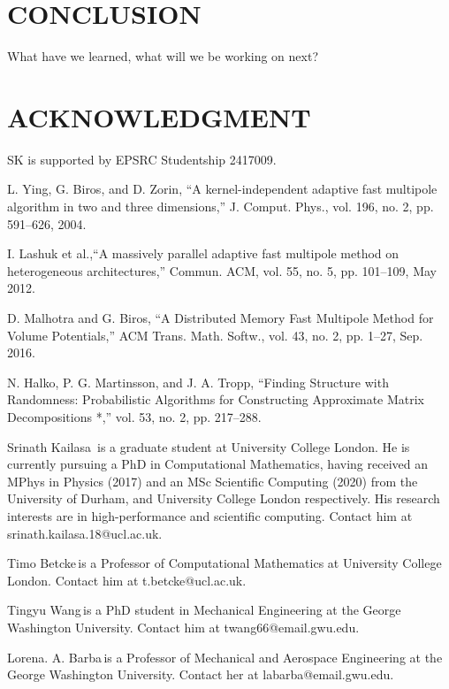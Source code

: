 \documentclass{IEEEcsmag}
\begin{document}
\section{CONCLUSION}

What have we learned, what will we be working on next?

\section{ACKNOWLEDGMENT}

SK is supported by EPSRC Studentship 2417009.

\begin{thebibliography}{1}

L. Ying, G. Biros, and D. Zorin, “A kernel-independent adaptive fast multipole algorithm in two and three dimensions,” J. Comput. Phys., vol. 196, no. 2, pp. 591–626, 2004.

I. Lashuk et al.,``A massively parallel adaptive fast multipole method on heterogeneous architectures,'' Commun. ACM, vol. 55, no. 5, pp. 101–109, May 2012.


D. Malhotra and G. Biros, “A Distributed Memory Fast Multipole Method for Volume Potentials,” ACM Trans. Math. Softw., vol. 43, no. 2, pp. 1–27, Sep. 2016.

N. Halko, P. G. Martinsson, and J. A. Tropp, “Finding Structure with Randomness: Probabilistic Algorithms for Constructing Approximate Matrix Decompositions *,” vol. 53, no. 2, pp. 217–288.

\end{thebibliography}


\begin{IEEEbiography}{Srinath Kailasa}{\,} is a graduate student at University College London. He is currently pursuing a PhD in Computational Mathematics, having received an MPhys in Physics (2017) and an MSc Scientific Computing (2020) from the University of Durham, and University College London respectively. His research interests are in high-performance and scientific computing. Contact him at srinath.kailasa.18@ucl.ac.uk.
\end{IEEEbiography}

\begin{IEEEbiography}{Timo Betcke}{\,}is a Professor of Computational Mathematics at University College London. Contact him at t.betcke@ucl.ac.uk.
\end{IEEEbiography}

\begin{IEEEbiography}{Tingyu Wang}{\,}is a PhD student in Mechanical Engineering at the George Washington University. Contact him at twang66@email.gwu.edu.
\end{IEEEbiography}

\begin{IEEEbiography}{Lorena. A. Barba}{\,}is a Professor of Mechanical and Aerospace Engineering at the George Washington University.  Contact her at labarba@email.gwu.edu.
\end{IEEEbiography}
\end{document}
